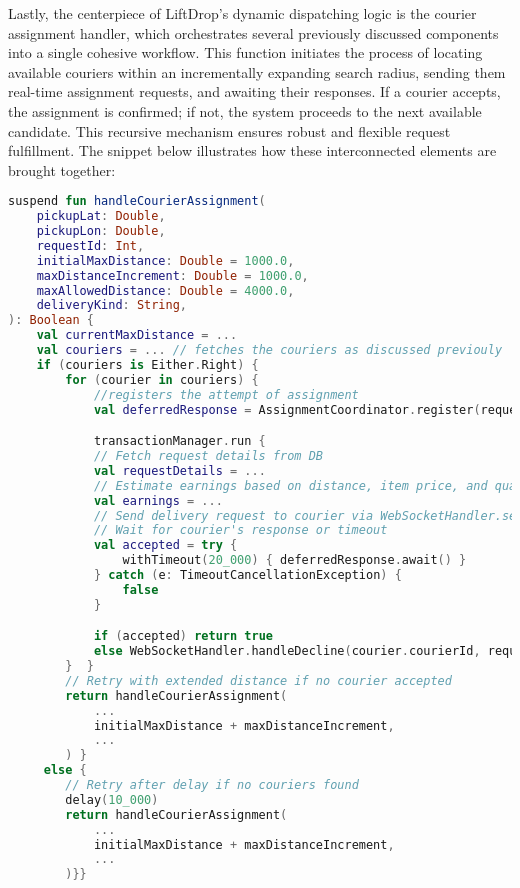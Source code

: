 Lastly, the centerpiece of LiftDrop’s dynamic dispatching logic is the courier assignment handler, which orchestrates several previously discussed components into a single cohesive workflow. This function initiates the process of locating available couriers within an incrementally expanding search radius, sending them real-time assignment requests, and awaiting their responses. If a courier accepts, the assignment is confirmed; if not, the system proceeds to the next available candidate. This recursive mechanism ensures robust and flexible request fulfillment. The snippet below illustrates how these interconnected elements are brought together:

\newpage

\begin{lstlisting}[language=Kotlin, caption={Handling Courier Assignments (Simplified Pseudocode)}]
suspend fun handleCourierAssignment(
    pickupLat: Double,
    pickupLon: Double,
    requestId: Int,
    initialMaxDistance: Double = 1000.0,
    maxDistanceIncrement: Double = 1000.0,
    maxAllowedDistance: Double = 4000.0,
    deliveryKind: String,
): Boolean {
    val currentMaxDistance = ...
    val couriers = ... // fetches the couriers as discussed previouly
    if (couriers is Either.Right) {
        for (courier in couriers) {
            //registers the attempt of assignment
            val deferredResponse = AssignmentCoordinator.register(requestId)

            transactionManager.run {
            // Fetch request details from DB
            val requestDetails = ...
            // Estimate earnings based on distance, item price, and quantity
            val earnings = ...
            // Send delivery request to courier via WebSocketHandler.sendAssignmentMessageToCourier(courier.courierId, requestDetails)
            // Wait for courier's response or timeout
            val accepted = try {
                withTimeout(20_000) { deferredResponse.await() }
            } catch (e: TimeoutCancellationException) {
                false
            }

            if (accepted) return true
            else WebSocketHandler.handleDecline(courier.courierId, requestId)
        }  }
        // Retry with extended distance if no courier accepted
        return handleCourierAssignment(
            ...
            initialMaxDistance + maxDistanceIncrement,
            ...
        ) }
     else {
        // Retry after delay if no couriers found
        delay(10_000)
        return handleCourierAssignment(
            ...
            initialMaxDistance + maxDistanceIncrement,
            ...
        )}}
\end{lstlisting}

